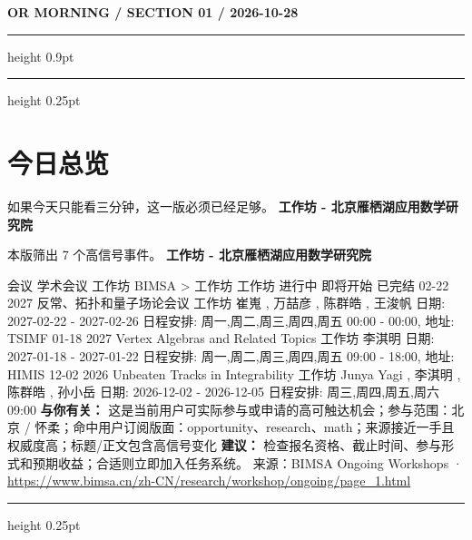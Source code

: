 \documentclass[10.5pt]{ctexart}
\begin{document}
{\small\bfseries OR MORNING / SECTION 01 / 2026-10-28}
\vspace{2mm}
\hrule height 0.9pt
\vspace{1.5mm}
\hrule height 0.25pt
\vspace{4mm}
\section*{今日总览}
{\color{ormuted} 如果今天只能看三分钟，这一版必须已经足够。}
\vspace{2mm}
{\fontsize{25}{29}\selectfont\bfseries 工作坊 - 北京雁栖湖应用数学研究院}\par
\vspace{2mm}
{\large 本版筛出 7 个高信号事件。}
\vspace{3mm}
{\Large\bfseries 工作坊 - 北京雁栖湖应用数学研究院}\par
会议 学术会议 工作坊 BIMSA > 工作坊 工作坊 进行中 即将开始 已完结 02-22 2027 反常、拓扑和量子场论会议 工作坊 崔嵬 , 万喆彦 , 陈群皓 , 王浚帆 日期: 2027-02-22 - 2027-02-26 日程安排: 周一,周二,周三,周四,周五 00:00 - 00:00, 地址: TSIMF 01-18 2027 Vertex Algebras and Related Topics 工作坊 李淇明 日期: 2027-01-18 - 2027-01-22 日程安排: 周一,周二,周三,周四,周五 09:00 - 18:00, 地址: HIMIS 12-02 2026 Unbeaten Tracks in Integrability 工作坊 Junya Yagi , 李淇明 , 陈群皓 , 孙小岳 日期: 2026-12-02 - 2026-12-05 日程安排: 周三,周四,周五,周六 09:00
\textbf{与你有关：} 这是当前用户可实际参与或申请的高可触达机会；参与范围：北京 / 怀柔；命中用户订阅版面：opportunity、research、math；来源接近一手且权威度高；标题/正文包含高信号变化
\textbf{建议：} 检查报名资格、截止时间、参与形式和预期收益；合适则立即加入任务系统。
{\footnotesize\color{ormuted} 来源：BIMSA Ongoing Workshops · \url{https://www.bimsa.cn/zh-CN/research/workshop/ongoing/page_1.html}}
\vspace{3mm}
\hrule height 0.25pt
\vspace{3mm}
\end{document}
